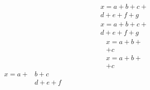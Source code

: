 \documentclass[12pt]{article}
\begin{document}
    \begin{multline}
        x = a +b + c + {} \\
        d + e + f +g
    \end{multline}
    \begin{multline*}
        x = a +b + c + {} \\
        d + e + f +g
    \end{multline*}
    \begin{multline*}
        x = a +b + \\ + c
    \end{multline*}
    \begin{multline*}
        x = a +b + {} \\ + c
    \end{multline*}
    $\begin{aligned}
        x = a + & b + c \\
        &d + e + f
    \end{aligned}$
    
\end{document}
